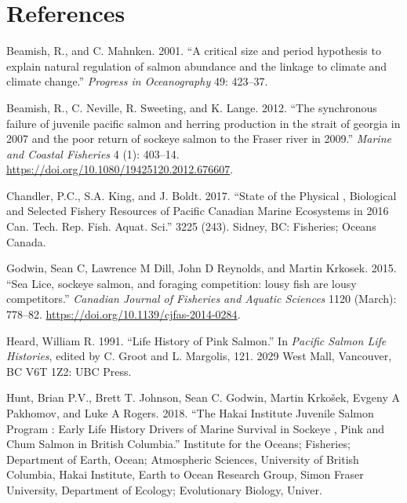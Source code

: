 \documentclass[fleqn,10pt]{wlpeerj} %
\begin{document}
\hypertarget{references}{%
\section*{References}\label{references}}

\hypertarget{refs}{}
\leavevmode\hypertarget{ref-Beamish2001}{}%
Beamish, R., and C. Mahnken. 2001. ``A critical size and period hypothesis to explain natural regulation of salmon abundance and the linkage to climate and climate change.'' \emph{Progress in Oceanography} 49: 423--37.

\leavevmode\hypertarget{ref-Beamish2012}{}%
Beamish, R., C. Neville, R. Sweeting, and K. Lange. 2012. ``The synchronous failure of juvenile pacific salmon and herring production in the strait of georgia in 2007 and the poor return of sockeye salmon to the Fraser river in 2009.'' \emph{Marine and Coastal Fisheries} 4 (1): 403--14. \url{https://doi.org/10.1080/19425120.2012.676607}.

\leavevmode\hypertarget{ref-Chandler2017}{}%
Chandler, P.C., S.A. King, and J. Boldt. 2017. ``State of the Physical , Biological and Selected Fishery Resources of Pacific Canadian Marine Ecosystems in 2016 Can. Tech. Rep. Fish. Aquat. Sci.'' 3225 (243). Sidney, BC: Fisheries; Oceans Canada.

\leavevmode\hypertarget{ref-Godwin2015}{}%
Godwin, Sean C, Lawrence M Dill, John D Reynolds, and Martin Krkosek. 2015. ``Sea Lice, sockeye salmon, and foraging competition: lousy fish are lousy competitors.'' \emph{Canadian Journal of Fisheries and Aquatic Sciences} 1120 (March): 778--82. \url{https://doi.org/10.1139/cjfas-2014-0284}.

\leavevmode\hypertarget{ref-Heard1991}{}%
Heard, William R. 1991. ``Life History of Pink Salmon.'' In \emph{Pacific Salmon Life Histories}, edited by C. Groot and L. Margolis, 121. 2029 West Mall, Vancouver, BC V6T 1Z2: UBC Press.

\leavevmode\hypertarget{ref-Hunt2018}{}%
Hunt, Brian P.V., Brett T. Johnson, Sean C. Godwin, Martin Krkošek, Evgeny A Pakhomov, and Luke A Rogers. 2018. ``The Hakai Institute Juvenile Salmon Program : Early Life History Drivers of Marine Survival in Sockeye , Pink and Chum Salmon in British Columbia.'' Institute for the Oceans; Fisheries; Department of Earth, Ocean; Atmospheric Sciences, University of British Columbia, Hakai Institute, Earth to Ocean Research Group, Simon Fraser University, Department of Ecology; Evolutionary Biology, Univer.
\end{document}
